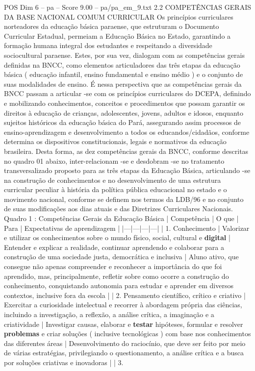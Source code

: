 \begin{textsample}{POS Dim 6 – pa – Score 9.00 – pa/pa\_em\_9.txt}  \label{ex:f6_pos_070}
2.2 COMPETÊNCIAS GERAIS DA BASE NACIONAL COMUM CURRICULAR Os princípios curriculares norteadores da educação básica paraense, que estruturam o Documento Curricular Estadual, permeiam a Educação Básica no Estado, garantindo a formação humana integral dos estudantes e respeitando a diversidade sociocultural paraense.
Estes, por sua vez, dialogam com as competências gerais definidas na BNCC, como elementos articuladores das três etapas da educação básica ( educação infantil, ensino fundamental e ensino médio ) e o conjunto de suas modalidades de ensino.
É nessa perspectiva que as competências gerais da BNCC passam a articular -se com os princípios curriculares do DCEPA, definindo e mobilizando conhecimentos, conceitos e procedimentos que possam garantir os direitos à educação de crianças, adolescentes, jovens, adultos e idosos, enquanto sujeitos históricos da educação básica do Pará, assegurando assim processos de ensino-aprendizagem e desenvolvimento a todos os educandos/cidadãos, conforme determina os dispositivos constitucionais, legais e normativos da educação brasileira.
Desta forma, as dez competências gerais da BNCC, conforme descritas no quadro 01 abaixo, inter-relacionam -se e desdobram -se no tratamento transversalizado proposto para as três etapas da Educação Básica, articulando -se na construção de conhecimentos e no desenvolvimento de uma estrutura curricular peculiar à história da política pública educacional no estado e o movimento nacional, conforme se definem nos termos da LDB/96 e no conjunto de suas modificações aos dias atuais e das Diretrizes Curriculares Nacionais.
Quadro 1 : Competências Gerais da Educação Básica | Competência | O que | Para | Expectativas de aprendizagem | |---|---|---|---| | 1.
Conhecimento | Valorizar e utilizar os conhecimentos sobre o mundo físico, social, cultural e \textbf{digital} | Entender e explicar a realidade, continuar aprendendo e colaborar para a construção de uma sociedade justa, democrática e inclusiva | Aluno ativo, que consegue não apenas compreender e reconhecer a importância do que foi aprendido, mas, principalmente, refletir sobre como ocorre a construção do conhecimento, conquistando autonomia para estudar e aprender em diversos contextos, inclusive fora da escola | | 2.
Pensamento científico, crítico e criativo | Exercitar a curiosidade intelectual e recorrer à abordagem própria das ciências, incluindo a investigação, a reflexão, a análise crítica, a imaginação e a criatividade | Investigar causas, elaborar e \textbf{testar} hipóteses, formular e resolver \textbf{problemas} e criar soluções ( inclusive tecnológicas ) com base nos conhecimentos das diferentes áreas | Desenvolvimento do raciocínio, que deve ser feito por meio de várias estratégias, privilegiando o questionamento, a análise crítica e a busca por soluções criativas e inovadoras | | 3.

\end{textsample}
